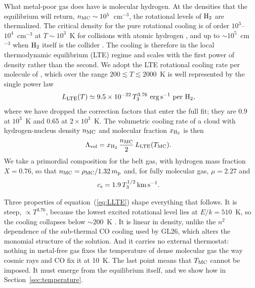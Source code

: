 \documentclass[twocolumn,pdftex]{aastex701}
\newcommand{\Tthree}{T_{3}}
\newcommand{\xhh}{x_{\rm H_2}}
\newcommand{\GL}{GL26}
\newcommand{\kms}{\,{\rm km\,s^{-1}}}
\newcommand{\Htwo}{{\rm H_2}}
\begin{document}
What metal-poor gas does have is molecular hydrogen. At the densities that the equilibrium will return, $n_{\rm MC}\sim10^{5}$~cm$^{-3}$, the rotational levels of $\Htwo$ are thermalized. The critical density for the pure rotational cooling is of order $10^{3}$--$10^{4}$~cm$^{-3}$ at $T\sim10^{3}$~K for collisions with atomic hydrogen \citep{Hollenbach:1979a,Galli:1998a,Glover:2008a}, and up to $\sim10^{5}$~cm$^{-3}$ when $\Htwo$ itself is the collider \citep{LeBourlot:1999a,Coppola:2019a}. The cooling is therefore in the local thermodynamic equilibrium (LTE) regime and scales with the first power of density rather than the second. We adopt the LTE rotational cooling rate per molecule of \citet{Hollenbach:1979a}, which over the range $200\lesssim T\lesssim2000$~K is well represented by the single power law
\begin{equation}
L_{\rm LTE}(T) \simeq 9.5\times10^{-22}\,\Tthree^{3.76}\ {\rm erg\,s^{-1}\ per\ H_2},
\label{eq:LLTE}
\end{equation}
where we have dropped the correction factors that enter the full fit; they are 0.9 at $10^{3}$~K and 0.65 at $2\times10^{3}$~K. The volumetric cooling rate of a cloud with hydrogen-nucleus density $n_{\rm MC}$ and molecular fraction $\xhh$ is then
\begin{equation}
\Lambda_{\rm vol} = \xhh\,\frac{n_{\rm MC}}{2}\,L_{\rm LTE}(T_{\rm MC}).
\label{eq:Lvol}
\end{equation}
We take a primordial composition for the belt gas, with hydrogen mass fraction $X = 0.76$, so that $n_{\rm MC} = \rho_{\rm MC}/1.32\,m_{\rm p}$ and, for fully molecular gas, $\mu = 2.27$ and
\begin{equation}
c_{\rm s} = 1.9\,\Tthree^{1/2}\kms.
\label{eq:cs}
\end{equation}

Three properties of equation~(\ref{eq:LLTE}) shape everything that follows. It is steep, $\propto T^{3.76}$, because the lowest excited rotational level lies at $E/k = 510$~K, so the cooling collapses below $\sim200$~K \citep{Bromm:2002a,Abel:2002a}. It is linear in density, unlike the $n^{2}$ dependence of the sub-thermal CO cooling used by \GL, which alters the monomial structure of the solution. And it carries no external thermostat: nothing in metal-free gas fixes the temperature of dense molecular gas the way cosmic rays and CO fix it at 10~K. The last point means that $T_{\rm MC}$ cannot be imposed. It must emerge from the equilibrium itself, and we show how in Section~\ref{sec:temperature}.
\end{document}
